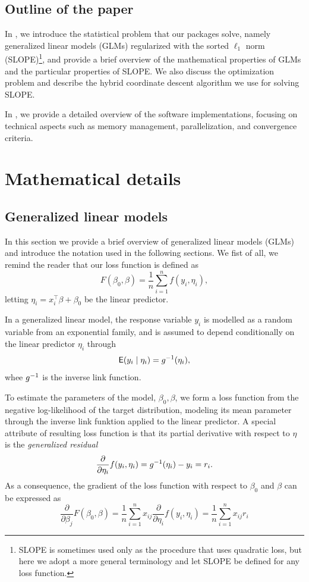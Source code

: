 \documentclass[article]{jss}
\let\Cref\crtCref
\begin{document}
\subsection{Outline of the paper}

In \Cref{sec:math-details}, we introduce the statistical problem that our
packages solve, namely generalized linear models (GLMs) regularized with the sorted
\(\ell_1\) norm (SLOPE)\footnote{SLOPE is sometimes used only as the procedure
  that uses quadratic loss, but here we adopt a more general terminology and
  let SLOPE be defined for any loss function.}, and provide a brief overview of
the mathematical properties of GLMs and the particular properties of SLOPE.
We also discuss the optimization problem and describe the hybrid
coordinate descent algorithm we use for solving SLOPE.

In \Cref{sec:implementation-details}, we provide a detailed overview of the
software implementations, focusing on technical aspects such as
memory management, parallelization, and convergence criteria.

\section{Mathematical details}\label{sec:math-details}

\subsection{Generalized linear models}
\label{sec:glm}

In this section we provide a brief overview of generalized linear models (GLMs)
and introduce the notation used in the following sections. We fist of all,
we remind the reader that our loss function is defined as
\[
  F(\beta_0, \beta) = \frac{1}{n} \sum_{i=1}^n f(y_i, \eta_i),
\]
letting \(\eta_i = x_i^\intercal \beta + \beta_0\) be the
linear predictor.

In a generalized linear model, the response variable \(y_i\) is modelled
as a random variable from an exponential family, and is assumed to depend
conditionally on the linear predictor \(\eta_i\) through
\[
  \mathsf{E}(y_i \mid \eta_i) = g^{-1}(\eta_i),
\]
whee \(g^{-1}\) is the inverse link function.

To estimate the parameters of the model, \(\beta_0, \beta\), we form a loss
function from the negative log-likelihood of the target distribution, modeling
its mean parameter through the inverse link funktion applied to the linear
predictor. A special attribute of resulting loss function is that its partial
derivative with respect to \(\eta\) is the
\emph{generalized residual}
\[
  \frac{\partial}{\partial \eta_i} f(y_i, \eta_i) = g^{-1}(\eta_i) - y_i = r_i.
\]
As a consequence, the gradient of the loss function with respect to \(\beta_0\)
and \(\beta\) can be expressed as
\[
  \frac{\partial}{\partial \beta_j} F(\beta_0,\beta)
  = \frac{1}{n} \sum_{i=1}^n x_{ij} \frac{\partial}{\partial \eta_i} f(y_i, \eta_i)
  = \frac{1}{n} \sum_{i=1}^n x_{ij} r_i
\]
\end{document}
